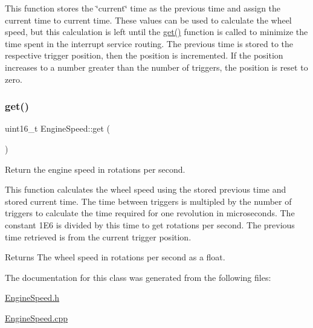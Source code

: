 This function stores the \char`\"{}current\char`\"{} time as the previous time and assign the current time to current time. These values can be used to calculate the wheel speed, but this calculation is left until the \mbox{\hyperlink{class_engine_speed_aa1e68329e56cf6dd0ff33ecd02e9af7b}{get()}} function is called to minimize the time spent in the interrupt service routing. The previous time is stored to the respective trigger position, then the position is incremented. If the position increases to a number greater than the number of triggers, the position is reset to zero. \mbox{\label{class_engine_speed_aa1e68329e56cf6dd0ff33ecd02e9af7b}} 
\subsubsection{\texorpdfstring{get()}{get()}}
{\footnotesize\ttfamily uint16\+\_\+t Engine\+Speed\+::get (\begin{DoxyParamCaption}{ }\end{DoxyParamCaption})}



Return the engine speed in rotations per second. 

This function calculates the wheel speed using the stored previous time and stored current time. The time between triggers is multipled by the number of triggers to calculate the time required for one revolution in microseconds. The constant 1\+E6 is divided by this time to get rotations per second. The previous time retrieved is from the current trigger position. \begin{DoxyReturn}{Returns}
The wheel speed in rotations per second as a float. 
\end{DoxyReturn}


The documentation for this class was generated from the following files\+:\begin{DoxyCompactItemize}
\item 
\mbox{\hyperlink{_engine_speed_8h}{Engine\+Speed.\+h}}\item 
\mbox{\hyperlink{_engine_speed_8cpp}{Engine\+Speed.\+cpp}}\end{DoxyCompactItemize}
